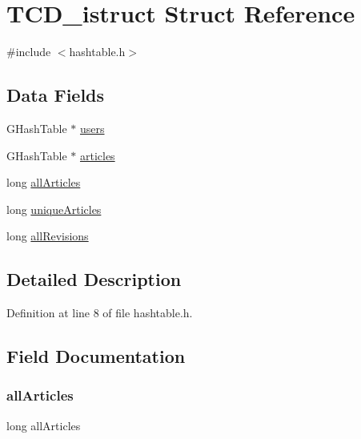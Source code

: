 \hypertarget{struct_t_c_d__istruct}{}\section{T\+C\+D\+\_\+istruct Struct Reference}
\label{struct_t_c_d__istruct}


{\ttfamily \#include $<$hashtable.\+h$>$}

\subsection*{Data Fields}
\begin{DoxyCompactItemize}
\item 
G\+Hash\+Table $\ast$ \hyperlink{struct_t_c_d__istruct_aa7c08dffa7cde1f8f0d0993fc0fcbec4}{users}
\item 
G\+Hash\+Table $\ast$ \hyperlink{struct_t_c_d__istruct_adc1bc7e9b16a11d6c3bc9b68623ad2b9}{articles}
\item 
long \hyperlink{struct_t_c_d__istruct_abcc2abac43f4b1afe2abf19875093a55}{all\+Articles}
\item 
long \hyperlink{struct_t_c_d__istruct_abc8b7c1fae0bcecc56740166a36ef37e}{unique\+Articles}
\item 
long \hyperlink{struct_t_c_d__istruct_ae688e4b4290e746a001f5d0343d8bf0c}{all\+Revisions}
\end{DoxyCompactItemize}


\subsection{Detailed Description}


Definition at line 8 of file hashtable.\+h.



\subsection{Field Documentation}
\mbox{\label{struct_t_c_d__istruct_abcc2abac43f4b1afe2abf19875093a55}} 
\subsubsection{\texorpdfstring{all\+Articles}{allArticles}}
{\footnotesize\ttfamily long all\+Articles}



